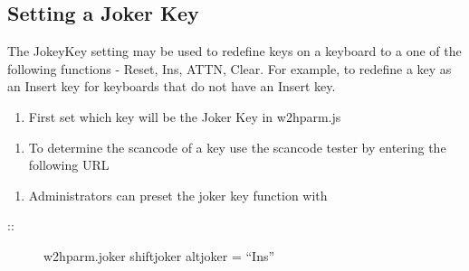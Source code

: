 \documentclass[letterpaper,10pt,english]{sphinxmanual}
\begin{document}
\subsection{Setting a Joker Key}
\label{\detokenize{Customization:setting-a-joker-key}}\label{\detokenize{Customization:index-1}}
The JokeyKey setting may be used to redefine keys on a keyboard to a one of the following functions - Reset, Ins, ATTN, Clear. For example, to redefine a key as an Insert key for keyboards that do not have an Insert key.
\begin{enumerate}
\def\theenumi{\arabic{enumi}}
\def\labelenumi{\theenumi .}
\makeatletter\def\p@enumii{\p@enumi \theenumi .}\makeatother
\item {} 
First set which key will be the Joker Key in w2hparm.js

\end{enumerate}

\begin{sphinxVerbatim}[commandchars=\\\{\}]
           
\end{sphinxVerbatim}
\begin{enumerate}
\def\theenumi{\arabic{enumi}}
\def\labelenumi{\theenumi .}
\makeatletter\def\p@enumii{\p@enumi \theenumi .}\makeatother
\setcounter{enumi}{1}
\item {} 
To determine the scancode of a key use the scancode tester by entering the following URL

\end{enumerate}

\begin{sphinxVerbatim}[commandchars=\\\{\}]
\end{sphinxVerbatim}
\begin{enumerate}
\def\theenumi{\arabic{enumi}}
\def\labelenumi{\theenumi .}
\makeatletter\def\p@enumii{\p@enumi \theenumi .}\makeatother
\setcounter{enumi}{2}
\item {} 
Administrators can preset the joker key function with

\end{enumerate}
\begin{description}
\item[{::}] \leavevmode
w2hparm.joker \textbar{} shiftjoker \textbar{} altjoker = “Ins”

\end{description}
\end{document}
